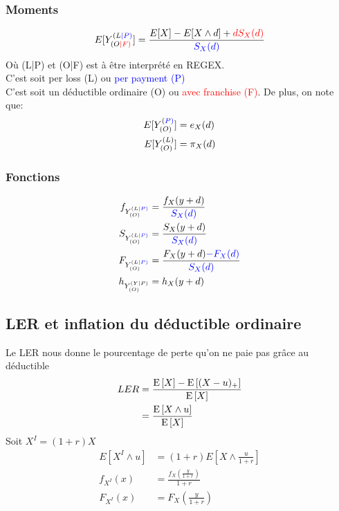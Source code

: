 \documentclass[french, landscape]{article}
\begin{document}
\begin{multicols*}{3}
\subsubsection*{Moments}
\begin{align*}
E[Y_{(O\textcolor{red}{|F)}}^{(L\textcolor{blue}{|P)}}] &= \frac{E[X] - E[X \wedge d] + \textcolor{red}{d S_X(d)} }{\textcolor{blue}{S_X(d)}} \\
\end{align*}
Où (L|P) et (O|F) est à être interprété en REGEX. \\
C'est soit per loss (L) ou \textcolor{blue}{per payment (P)} \\
C'est soit un déductible ordinaire (O) ou \textcolor{red}{avec franchise (F)}.
De plus, on note que:
\begin{align*}
E[Y_{(O)}^{(\textcolor{blue}{P)}}] &= e_X(d) \\
E[Y_{(O)}^{(L)}] &= \pi_X(d)
\end{align*}

\subsubsection*{Fonctions}
\begin{align*}
f_{Y^{(L\textcolor{blue}{|P)}}_{(O)}} &= \frac{f_X(y+d)}{\textcolor{blue}{S_X(d)}} \\
S_{Y^{(L\textcolor{blue}{|P)}}_{(O)}} &= \frac{S_X(y+d)}{\textcolor{blue}{S_X(d)}} \\
F_{Y^{(L\textcolor{blue}{|P)}}_{(O)}} &= \frac{F_X(y+d) \textcolor{blue}{- F_X(d)}}{\textcolor{blue}{S_X(d)}} \\
h_{Y^{(Y|P)}_{(O)}} &= h_X(y+d) \\
\end{align*}


\subsection*{LER et inflation du déductible ordinaire}
Le LER nous donne le pourcentage de perte qu'on ne paie pas grâce au déductible
\begin{align*}
	LER 	 &= \frac{\mathrm{E} \left[ X \right] - \mathrm{E} \left[ (X-u)_+ \right]}{\mathrm{E} \left[ X \right]} \\
	     &= \frac{\mathrm{E} \left[ X \wedge u \right]}{\mathrm{E} \left[ X \right]} \\
\end{align*}
Soit $X^I = (1 + r) X$
\begin{align*}
	E[{X^I} \wedge u]	 &= (1 + r) E[X \wedge \frac{u}{1 + r}] \\
	f_{X^I}(x) &= \frac{f_X\left(\frac{y}{1 + r}\right)}{1 + r} \\
	F_{X^I}(x) &= F_X\left(\frac{y}{1 + r}\right)
\end{align*}


\end{multicols*}
\end{document}
